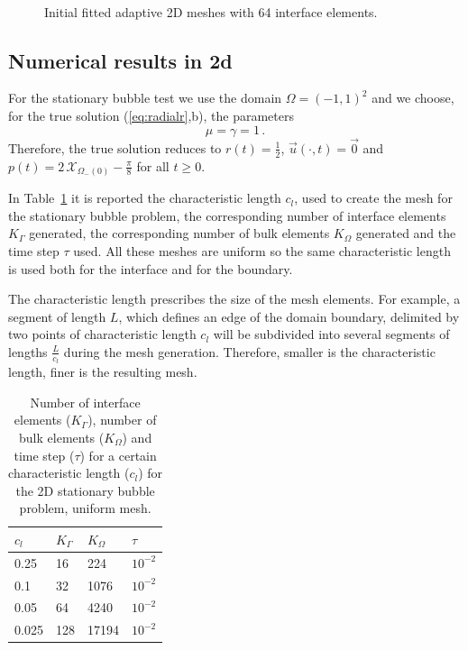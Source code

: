 \documentclass[a4paper,12pt,onecolumn]{article}
\newcommand{\bigchi}{\ensuremath{\mathrm{\mathcal{X}}}}
\newcommand{\charfcn}[1]{\bigchi_{#1}} %
\begin{document}
\begin{figure}[htbp]
  \centering
  \quad
  \\
  \caption{Initial fitted adaptive 2D meshes with 64 interface elements.}
  \label{fig:meshes_adaptive}
\end{figure}

\subsection{Numerical results in 2d} \label{subsec:numerical_results_2d}

For the stationary bubble test we use the domain $\Omega = (-1,1)^2$ and we
choose, for the true solution (\ref{eq:radialr},b), the parameters
\begin{equation*}
\mu = \gamma = 1\,.
\end{equation*}
Therefore, the true solution reduces to $r(t) = \frac{1}{2}$, $\vec u(\cdot, t)
= \vec 0$ and $p(t) = 2\,\charfcn{\Omega_-(0)} - \frac{\pi}{8}$ for all $t \geq
0$.

In Table~\ref{tab:bubble2Delementsuniform} it is reported the characteristic
length $c_l$, used to create the mesh for the stationary bubble problem, the
corresponding number of interface elements $K_\Gamma$ generated, the
corresponding number of bulk elements $K_\Omega$ generated and the time step
$\tau$ used. All these meshes are uniform so the same characteristic length is
used both for the interface and for the boundary.

The characteristic length prescribes the size of the mesh elements. For
example, a segment of length $L$, which defines an edge of the domain boundary,
delimited by two points of characteristic length $c_l$ will be subdivided into
several segments of lengths $\frac{L}{c_l}$ during the mesh generation.
Therefore, smaller is the characteristic length, finer is the resulting mesh.
\begin{table}
 \center
\begin{tabular}{llll}
\hline
$c_l$ & $K_\Gamma$ & $K_\Omega$ & $\tau$ \\
\hline
0.25 & 16 & 224 & $10^{-2}$ \\
0.1 & 32 & 1076 & $10^{-2}$\\
0.05 & 64 & 4240 & $10^{-2}$\\
0.025 & 128 & 17194 & $10^{-2}$ \\
\hline
\end{tabular}
\caption{Number of interface elements ($K_\Gamma$), number of bulk elements
($K_\Omega$) and time step ($\tau$) for a certain characteristic length ($c_l$)
for the 2D stationary bubble problem, uniform mesh.}
\label{tab:bubble2Delementsuniform}
\end{table}
\end{document}
